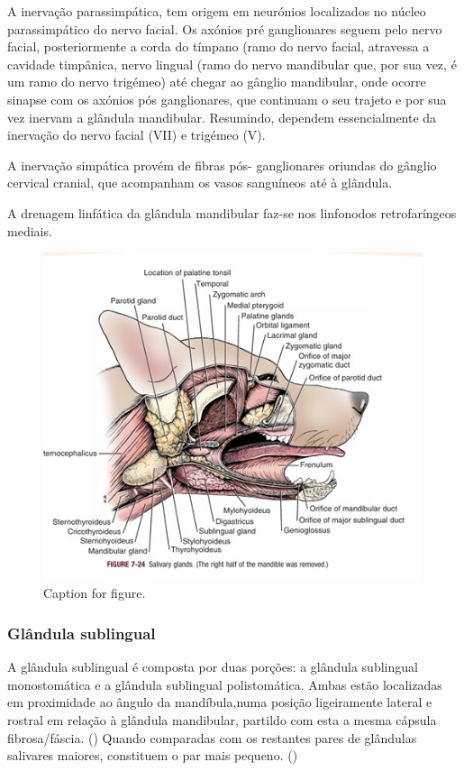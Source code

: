 A inervação parassimpática, tem origem em neurónios localizados no núcleo parassimpático do nervo facial. Os axónios pré ganglionares seguem pelo nervo facial, posteriormente a corda do tímpano (ramo do nervo facial, atravessa a cavidade timpânica, nervo lingual (ramo do nervo mandibular que, por sua vez, é um ramo do nervo trigémeo) até chegar ao gânglio mandibular, onde ocorre sinapse com os axónios pós ganglionares, que continuam o seu trajeto e por sua vez inervam a glândula mandibular. Resumindo, dependem essencialmente da inervação do nervo facial (VII) e trigémeo (V).


A inervação simpática provém de fibras pós- ganglionares  oriundas do gânglio cervical cranial, que acompanham os vasos sanguíneos até à glândula.


A drenagem linfática da glândula mandibular faz-se nos linfonodos retrofaríngeos mediais.


\begin{figure}[!htb]
  \centering
  \includegraphics[width=0.99\textwidth]{../Figures/glls.jpg}
  \caption[Caption for figure in TOC.]{Caption for figure.}
  \label{fig:ggglyjdfg}
\end{figure}

\subsubsection{Glândula sublingual}

A glândula sublingual é composta por duas porções: a glândula sublingual monostomática e a glândula sublingual polistomática. Ambas estão localizadas em proximidade ao ângulo da mandíbula,numa posição ligeiramente lateral e rostral em relação à glândula mandibular, partil\cite{Han2016}do com esta a mesma cápsula fibrosa/fáscia. (\cite{evans_millers_2012}) \cite{Brown2016} Quando comparadas com os restantes pares de glândulas salivares maiores, constituem o par mais pequeno. (\cite{evans_millers_2012})


